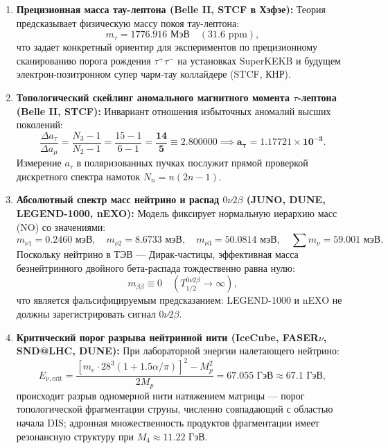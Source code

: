 \documentclass[11pt,a4paper]{article}
\theoremstyle{definition}
\theoremstyle{remark}
\begin{document}
\begin{enumerate}
    \item \textbf{Прецизионная масса тау-лептона (Belle II, STCF в Хэфэе):}
    Теория предсказывает физическую массу покоя тау-лептона:
    \begin{equation}
        m_\tau = \mathbf{1776.916\text{ МэВ}} \quad (31.6\text{ ppm}),
    \end{equation}
    что задает конкретный ориентир для экспериментов по прецизионному сканированию порога рождения $\tau^+\tau^-$ на установках SuperKEKB и будущем электрон-позитронном супер чарм-тау коллайдере (STCF, КНР).

    \item \textbf{Топологический скейлинг аномального магнитного момента $\tau$-лептона (Belle II, STCF):}
    Инвариант отношения избыточных аномалий высших поколений:
    \begin{equation}
        \frac{\Delta a_\tau}{\Delta a_\mu} = \frac{N_3 - 1}{N_2 - 1} = \frac{15 - 1}{6 - 1} = \boldsymbol{\frac{14}{5} \equiv 2.800000} \implies \mathbf{a_\tau = 1.17721 \times 10^{-3}}.
    \end{equation}
    Измерение $a_\tau$ в поляризованных пучках послужит прямой проверкой дискретного спектра намоток $N_n = n(2n-1)$.

    \item \textbf{Абсолютный спектр масс нейтрино и распад $0\nu 2\beta$ (JUNO, DUNE, LEGEND-1000, nEXO):}
    Модель фиксирует нормальную иерархию масс (NO) со значениями:
    \begin{equation}
        m_{\nu 1} = 0.2460\text{ мэВ}, \quad m_{\nu 2} = 8.6733\text{ мэВ}, \quad m_{\nu 3} = 50.0814\text{ мэВ}, \quad \sum m_\nu = \mathbf{59.001\text{ мэВ}}.
    \end{equation}
    Поскольку нейтрино в ТЭВ — Дирак-частицы, эффективная масса безнейтринного двойного бета-распада тождественно равна нулю:
    \begin{equation}
        m_{\beta\beta} \equiv 0 \quad (T_{1/2}^{0\nu 2\beta} \to \infty),
    \end{equation}
    что является фальсифицируемым предсказанием: LEGEND-1000 и nEXO не должны зарегистрировать сигнал $0\nu 2\beta$.

    \item \textbf{Критический порог разрыва нейтринной нити (IceCube, FASER$\nu$, SND@LHC, DUNE):}
    При лабораторной энергии налетающего нейтрино:
    \begin{equation}
        E_{\nu, \mathrm{crit}} = \frac{[m_e \cdot 28^3(1+1.5\alpha/\pi)]^2 - M_p^2}{2 M_p} = \mathbf{67.055\text{ ГэВ}} \approx \mathbf{67.1\text{ ГэВ}},
    \end{equation}
    происходит разрыв одномерной нити натяжением матрицы — порог топологической фрагментации струны, численно совпадающий с областью начала DIS; адронная множественность продуктов фрагментации имеет резонансную структуру при $M_4 \approx 11.22\text{ ГэВ}$.


\end{enumerate}
\end{document}
